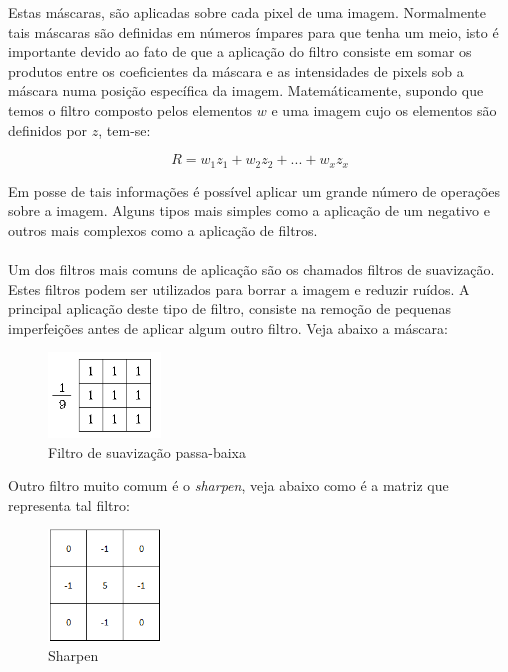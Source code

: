 \documentclass[a4paper,10pt]{article}
\begin{document}
Estas máscaras, são aplicadas sobre cada pixel de uma imagem. Normalmente tais
máscaras são definidas em números ímpares para que tenha um meio, isto é
importante devido ao fato de que a aplicação do filtro consiste em somar os
produtos entre os coeficientes da máscara e as intensidades de pixels sob a
máscara numa posição específica da imagem. Matemáticamente, supondo que temos
o filtro composto pelos elementos $w$ e uma imagem cujo os elementos são
definidos por $z$, tem-se:

$$R = w_1z_1 + w_2z_2 + ... + w_xz_x$$

Em posse de tais informações é possível aplicar um grande número de operações
sobre a imagem. Alguns tipos mais simples como a aplicação de um negativo e 
outros mais complexos como a aplicação de filtros.

\paragraph{}
Um dos filtros mais comuns de aplicação são os chamados filtros de suavização.
Estes filtros podem ser utilizados para borrar a imagem e reduzir ruídos. 
A principal aplicação deste tipo de filtro, consiste na remoção de
pequenas imperfeições antes de aplicar algum outro filtro. Veja abaixo a
máscara:

\begin{figure}[ht]
 \center
 \includegraphics[width=3cm]{imagem/passa_baixa.png}
 \caption {Filtro de suavização passa-baixa}
\end{figure}

Outro filtro muito comum é o \textit{sharpen}, veja abaixo como é a matriz que
representa tal filtro:

\begin{figure}[ht]
 \center
 \includegraphics[width=3cm]{imagem/sharpen.png}
 \caption {Sharpen}
\end{figure}
\end{document}
